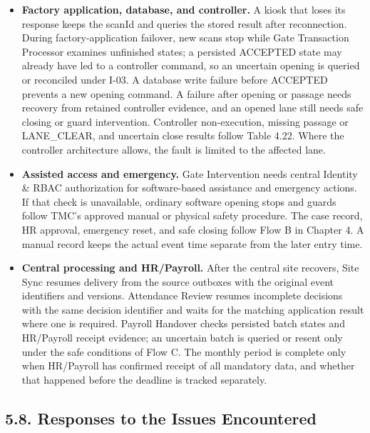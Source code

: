 \begin{itemize}[leftmargin=36pt, itemsep=2pt, topsep=4pt, parsep=2pt]
  \item \textbf{Factory application, database, and controller.} A kiosk that loses its response keeps the scanId and queries the stored result after reconnection. During factory-application failover, new scans stop while Gate Transaction Processor examines unfinished states; a persisted ACCEPTED state may already have led to a controller command, so an uncertain opening is queried or reconciled under I-03. A database write failure before ACCEPTED prevents a new opening command. A failure after opening or passage needs recovery from retained controller evidence, and an opened lane still needs safe closing or guard intervention. Controller non-execution, missing passage or LANE\_CLEAR, and uncertain close results follow Table 4.22. Where the controller architecture allows, the fault is limited to the affected lane.
  \item \textbf{Assisted access and emergency.} Gate Intervention needs central Identity \& RBAC authorization for software-based assistance and emergency actions. If that check is unavailable, ordinary software opening stops and guards follow TMC's approved manual or physical safety procedure. The case record, HR approval, emergency reset, and safe closing follow Flow B in Chapter 4. A manual record keeps the actual event time separate from the later entry time.
  \item \textbf{Central processing and HR/Payroll.} After the central site recovers, Site Sync resumes delivery from the source outboxes with the original event identifiers and versions. Attendance Review resumes incomplete decisions with the same decision identifier and waits for the matching application result where one is required. Payroll Handover checks persisted batch states and HR/Payroll receipt evidence; an uncertain batch is queried or resent only under the safe conditions of Flow C. The monthly period is complete only when HR/Payroll has confirmed receipt of all mandatory data, and whether that happened before the deadline is tracked separately.
\end{itemize}

\subsection*{5.8. Responses to the Issues Encountered}

{}

